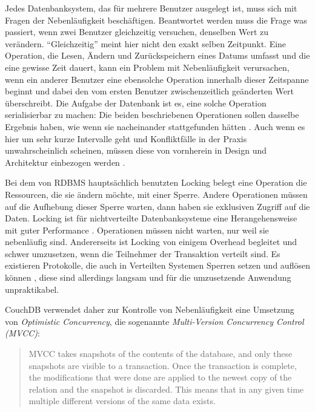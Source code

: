 Jedes Datenbanksystem, das für mehrere Benutzer ausgelegt ist, muss sich mit Fragen der Nebenläufigkeit beschäftigen. Beantwortet werden muss die Frage was passiert, wenn zwei Benutzer gleichzeitig versuchen, denselben Wert zu verändern. \enquote{Gleichzeitig} meint hier nicht den exakt selben Zeitpunkt. Eine Operation, die Lesen, Ändern und Zurückspeichern eines Datums umfasst und die eine gewisse Zeit dauert, kann ein Problem mit Nebenläufigkeit verursachen, wenn ein anderer Benutzer eine ebensolche Operation innerhalb dieser Zeitspanne beginnt und dabei den vom ersten Benutzer zwischenzeitlich geänderten Wert überschreibt. Die Aufgabe der Datenbank ist es, eine solche Operation serialisierbar zu machen: Die beiden beschriebenen Operationen sollen dasselbe Ergebnis haben, wie wenn sie nacheinander stattgefunden hätten . Auch wenn es hier um sehr kurze Intervalle geht und Konfliktfälle in der Praxis unwahrscheinlich scheinen, müssen diese von vornherein in Design und Architektur einbezogen werden .

Bei dem von RDBMS hauptsächlich benutzten Locking belegt eine Operation die Ressourcen, die sie ändern möchte, mit einer Sperre. Andere Operationen müssen auf die Aufhebung dieser Sperre warten, dann haben sie exklusiven Zugriff auf die Daten. Locking ist für nichtverteilte Datenbanksysteme eine Herangehensweise mit guter Performance . Operationen müssen nicht warten, nur weil sie nebenläufig sind. Andererseits ist Locking von einigem Overhead begleitet und schwer umzusetzen, wenn die Teilnehmer der Transaktion verteilt sind. Es existieren Protokolle, die auch in Verteilten Systemen Sperren setzen und auflösen können , diese sind allerdings langsam und für die umzusetzende Anwendung unpraktikabel.

CouchDB verwendet daher zur Kontrolle von Nebenläufigkeit eine Umsetzung von \textit{Optimistic Concurrency}, die sogenannte \textit{Multi-Version Concurrency Control (MVCC)}:

\begin{quote}
MVCC takes snapshots of the contents of the database, and only these snapshots are visible to a transaction. Once the transaction is complete, the modifications that were done are applied to the newest copy of the relation and the snapshot is discarded. This means that in any given time multiple different versions of the same data exists. 
\end{quote}

